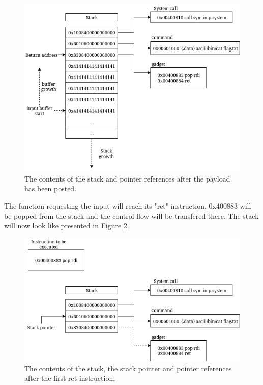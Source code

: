 \begin{figure}[h]
	\centering
	\includegraphics[width=\textwidth]{background/software-diversity/figures/after-payload}
	\caption{The contents of the stack and pointer references after the payload has been posted.}
	\label{fig:after-payload}
\end{figure}

The function requesting the input will reach its "ret" instruction, 0x400883 will be popped
from the stack and the control flow will be transfered there. The stack will now look like
presented in Figure \ref{fig:after-first}.

\begin{figure}[h]
	\centering
	\includegraphics[width=\textwidth]{background/software-diversity/figures/after-first}
	\caption{The contents of the stack, the stack pointer and pointer references after the first ret instruction.}
	\label{fig:after-first}
\end{figure}

